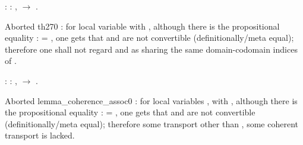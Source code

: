 \coqdocemptyline
\begin{coqdoccode}
\coqdocnoindent
{}  : \coqdockw{\ensuremath{\forall}}  : ,   \ensuremath{\rightarrow}   \coqdocnotation{=} .\coqdoceol
\end{coqdoccode}
Aborted th270 : for local variable  with  ,
although there is the propositional equality :   = , one gets 
that   and  are not convertible (definitionally/meta equal);
therefore one shall not regard  and   as sharing
the same domain-codomain indices of . \begin{coqdoccode}
\coqdocnoindent
{}  : \coqdockw{\ensuremath{\forall}}   : ,    \ensuremath{\rightarrow}   \coqdocnotation{=}  .\coqdoceol
\end{coqdoccode}
Aborted lemma\_coherence\_assoc0 : for local variables ,  with   ,
although there is the propositional equality  :   =  ,
one gets that   and   are not convertible (definitionally/meta equal);
therefore some transport other than , some coherent transport is lacked. 

